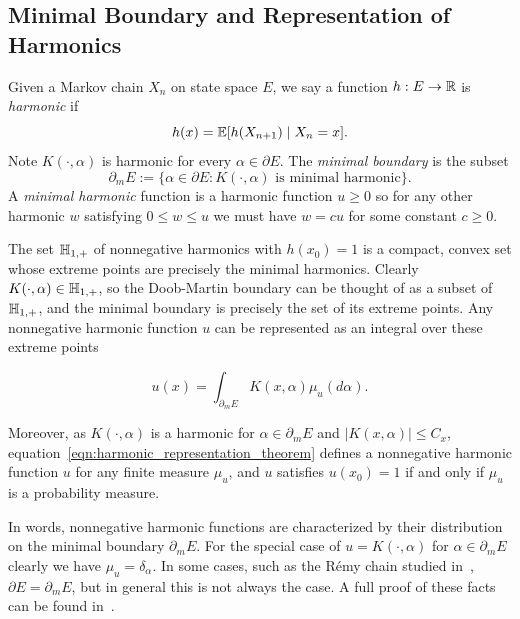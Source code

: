 \begin{subappendices}
\subsection{Minimal Boundary and Representation of Harmonics}

\noindent Given a Markov chain $X_n$ on state space $E$, we say a function $h:E \to \mathbb{R}$ is \textit{harmonic} if
%
    \[h(x) = \mathbb{E} [h(X_{n+1}) \; | \; X_n = x].\]
%
\noindent Note $K(\cdot, \alpha)$ is harmonic for every $\alpha \in \partial E$. The \textit{minimal boundary} is the subset
%
    \begin{equation}
        \partial_m E := \{ \alpha \in \partial E : K(\cdot, \alpha) \text{ is minimal harmonic}\}.
    \end{equation}
%
\noindent A \textit{minimal harmonic} function is a harmonic function $u \geq 0$ so
 for any other harmonic $w$ satisfying $0 \leq w \leq u$ we must have $w = c u$ for
 some constant $c \geq 0$.

The set $\mathbb{H}_{1,+}$ of nonnegative harmonics with $h(x_0) = 1$ is a compact, convex set whose
extreme points are precisely the minimal harmonics. Clearly $K(\cdot, \alpha) \in \mathbb{H}_{1,+}$, so
the Doob-Martin boundary can be thought of as a subset of $\mathbb{H}_{1,+}$, and
the minimal boundary is precisely the set of its extreme points.
Any nonnegative harmonic function $u$ can be represented
as an integral over these extreme points

\begin{equation}
    u(x) = \int_{\partial_m E} K(x, \alpha) \mu_u(d\alpha).
    \label{eqn:harmonic_representation_theorem}
\end{equation}

\noindent Moreover, as $K(\cdot, \alpha)$ is a harmonic for $\alpha \in \partial_m E$
and $|K(x, \alpha)| \leq C_x$, equation~\eqref{eqn:harmonic_representation_theorem}
defines a nonnegative harmonic function $u$ for any finite measure $\mu_u$, and $u$ satisfies
$u(x_0) = 1$ if and only if $\mu_u$ is a probability measure.

In words, nonnegative harmonic functions are characterized by their distribution on the minimal boundary $\partial_m E$.
For the special case of $u = K(\cdot, \alpha)$ for $\alpha \in \partial_m E$ clearly we have $\mu_{u} = \delta_\alpha$.
In some cases, such as the R\'emy chain studied in~\cite{evans2014_doob_martin_remy_tree_growth}, $\partial E = \partial_m E$, but in
general this is not always the case. A full proof of these facts can be found in~\cite{sawyer_martin_boundaries_random_walks}.


\end{subappendices}
